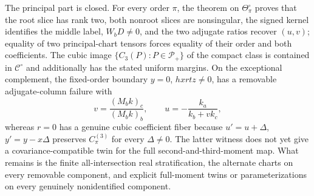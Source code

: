 The principal part is closed.  For every order \(\pi\), the theorem on \(\Theta_{\pi}^{\circ}\) proves that the root slice has rank two, both nonroot slices are nonsingular, the signed kernel identifies the middle label, \(W_bD\ne0\), and the two adjugate ratios recover \((u,v)\); equality of two principal-chart tensors forces equality of their order and both coefficients.  The cubic image \(\{C_3(P):P\in\mathcal P_+\}\) of the compact class is contained in \(\mathcal C^\circ\) and additionally has the stated uniform margins.  On the exceptional complement, the fixed-order boundary \(y=0\), \(hxrtz\ne0\), has a removable adjugate-column failure with
\[
v=\frac{(M_bk)_c}{(M_bk)_b},
\qquad
u=-\frac{k_a}{k_b+vk_c},
\]
whereas \(r=0\) has a genuine cubic coefficient fiber because \(u'=u+\Delta\), \(y'=y-x\Delta\) preserves \(C_{\pi}^{(3)}\) for every \(\Delta\ne0\).  The latter witness does not yet give a covariance-compatible twin for the full second-and-third-moment map.  What remains is the finite all-intersection real stratification, the alternate charts on every removable component, and explicit full-moment twins or parameterizations on every genuinely nonidentified component.
